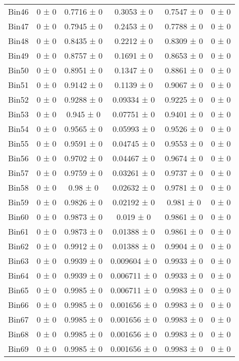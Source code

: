 \begin{tabular}{@{\extracolsep{4pt}}lccccc@{}}
     Bin46 & 0 ± 0 & 0.7716 ± 0 & 0.3053 ± 0 & 0.7547 ± 0 & 0 ± 0 \\ 
     Bin47 & 0 ± 0 & 0.7945 ± 0 & 0.2453 ± 0 & 0.7788 ± 0 & 0 ± 0 \\ 
     Bin48 & 0 ± 0 & 0.8435 ± 0 & 0.2212 ± 0 & 0.8309 ± 0 & 0 ± 0 \\ 
     Bin49 & 0 ± 0 & 0.8757 ± 0 & 0.1691 ± 0 & 0.8653 ± 0 & 0 ± 0 \\ 
     Bin50 & 0 ± 0 & 0.8951 ± 0 & 0.1347 ± 0 & 0.8861 ± 0 & 0 ± 0 \\ 
     Bin51 & 0 ± 0 & 0.9142 ± 0 & 0.1139 ± 0 & 0.9067 ± 0 & 0 ± 0 \\ 
     Bin52 & 0 ± 0 & 0.9288 ± 0 & 0.09334 ± 0 & 0.9225 ± 0 & 0 ± 0 \\ 
     Bin53 & 0 ± 0 & 0.945 ± 0 & 0.07751 ± 0 & 0.9401 ± 0 & 0 ± 0 \\ 
     Bin54 & 0 ± 0 & 0.9565 ± 0 & 0.05993 ± 0 & 0.9526 ± 0 & 0 ± 0 \\ 
     Bin55 & 0 ± 0 & 0.9591 ± 0 & 0.04745 ± 0 & 0.9553 ± 0 & 0 ± 0 \\ 
     Bin56 & 0 ± 0 & 0.9702 ± 0 & 0.04467 ± 0 & 0.9674 ± 0 & 0 ± 0 \\ 
     Bin57 & 0 ± 0 & 0.9759 ± 0 & 0.03261 ± 0 & 0.9737 ± 0 & 0 ± 0 \\ 
     Bin58 & 0 ± 0 & 0.98 ± 0 & 0.02632 ± 0 & 0.9781 ± 0 & 0 ± 0 \\ 
     Bin59 & 0 ± 0 & 0.9826 ± 0 & 0.02192 ± 0 & 0.981 ± 0 & 0 ± 0 \\ 
     Bin60 & 0 ± 0 & 0.9873 ± 0 & 0.019 ± 0 & 0.9861 ± 0 & 0 ± 0 \\ 
     Bin61 & 0 ± 0 & 0.9873 ± 0 & 0.01388 ± 0 & 0.9861 ± 0 & 0 ± 0 \\ 
     Bin62 & 0 ± 0 & 0.9912 ± 0 & 0.01388 ± 0 & 0.9904 ± 0 & 0 ± 0 \\ 
     Bin63 & 0 ± 0 & 0.9939 ± 0 & 0.009604 ± 0 & 0.9933 ± 0 & 0 ± 0 \\ 
     Bin64 & 0 ± 0 & 0.9939 ± 0 & 0.006711 ± 0 & 0.9933 ± 0 & 0 ± 0 \\ 
     Bin65 & 0 ± 0 & 0.9985 ± 0 & 0.006711 ± 0 & 0.9983 ± 0 & 0 ± 0 \\ 
     Bin66 & 0 ± 0 & 0.9985 ± 0 & 0.001656 ± 0 & 0.9983 ± 0 & 0 ± 0 \\ 
     Bin67 & 0 ± 0 & 0.9985 ± 0 & 0.001656 ± 0 & 0.9983 ± 0 & 0 ± 0 \\ 
     Bin68 & 0 ± 0 & 0.9985 ± 0 & 0.001656 ± 0 & 0.9983 ± 0 & 0 ± 0 \\ 
     Bin69 & 0 ± 0 & 0.9985 ± 0 & 0.001656 ± 0 & 0.9983 ± 0 & 0 ± 0 \\ 

\end{tabular}
